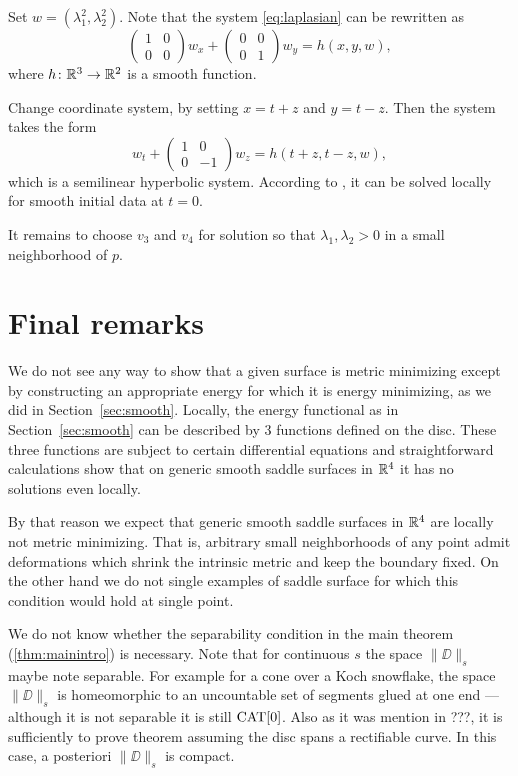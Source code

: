 \documentclass{article}
\begin{document}
Set $w=(\lambda_1^2,\lambda_2^2)$.
Note that the system \ref{eq:laplasian} can be rewritten as 
\[\left(\begin{smallmatrix}
   1&0\\0&0
  \end{smallmatrix}\right)
w_x
+
\left(\begin{smallmatrix}
   0&0\\0&1
  \end{smallmatrix}\right)
w_y=h(x,y,w),\]
where $h\colon\mathbb{R}^3\to\mathbb{R}^2$ is a smooth function.

Change coordinate system, by setting $x=t+z$ and $y=t-z$.
Then the system takes the form 
\[w_t+\left(\begin{smallmatrix}
   1&0\\0&-1
  \end{smallmatrix}\right)
w_z=h(t+z,t-z,w),\]
which is a semilinear hyperbolic system.
According to \cite[Theorem 3.6]{bressan}, it can be solved locally for smooth initial data at $t=0$.

It remains to choose $v_3$ and $v_4$ for solution so that $\lambda_1, \lambda_2>0$ in a small neighborhood of $p$.
\qeds


\section{Final remarks}\label{Final remarks}

We do not see any way to show that a given surface is metric minimizing except by constructing an appropriate energy for which it is energy minimizing, as we did in Section~\ref{sec:smooth}.
Locally, the energy functional as in Section~\ref{sec:smooth} can be described by 3 functions defined on the disc.
These three functions are subject to certain differential equations and 
straightforward calculations show that on generic smooth saddle surfaces in $\mathbb{R}^4$ 
it has no solutions even locally.

By that reason we expect that generic smooth saddle surfaces in $\mathbb{R}^4$ are locally not metric minimizing. 
That is, arbitrary small neighborhoods of any point admit deformations which shrink 
the intrinsic metric and keep the boundary fixed.
On the other hand we do not single examples of saddle surface for which this condition would hold at single point.

We do not know whether the separability condition in the main theorem (\ref{thm:mainintro}) is necessary.
Note that for continuous $s$ the space $\|\DD\|_s$ maybe note separable.
For example for a cone over a Koch snowflake, the space $\|\DD\|_s$ is homeomorphic to an uncountable set of segments glued at one end --- although it is not separable it is still $\mathop{\rm CAT}\nolimits[0]$.
Also as it was mention in ???, 
it is sufficiently to prove theorem assuming the disc spans a rectifiable curve.
In this case, a posteriori $\|\DD\|_s$ is compact.
\end{document}
